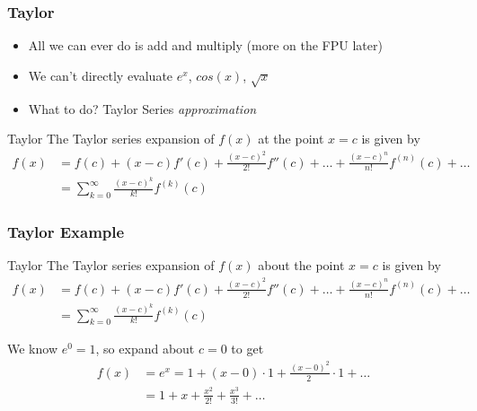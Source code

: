 \documentclass[10pt]{beamer}
\begin{document}
\begin{frame}
\frametitle{Taylor}
  \begin{itemize}
    \item All we can ever do is add and multiply (more on the FPU later)
    \item We can't directly evaluate $e^{x}$, $cos(x)$, $\sqrt{x}$
    \item What to do?  Taylor Series \emph{approximation}
\end{itemize}
\begin{block}{Taylor}
  The Taylor series expansion of $f(x)$ at the point $x=c$ is given by
  \begin{align*}
    f(x) &= f(c) + (x-c) f'(c) + \frac{(x-c)^2}{2!} f''(c) + \dots +
\frac{(x-c)^n}{n!} f^{(n)}(c)+\dots\\
        &= \sum_{k=0}^{\infty} \frac{(x-c)^{k}}{k!} f^{(k)}(c)
\end{align*}
\end{block}
\end{frame}
\begin{frame}
\frametitle{Taylor Example}
\begin{block}{Taylor}
  The Taylor series expansion of $f(x)$ about the point $x=c$ is given by
  \begin{align*}
    f(x) &= f(c) + (x-c) f'(c) + \frac{(x-c)^2}{2!} f''(c) + \dots +
\frac{(x-c)^n}{n!} f^{(n)}(c)+\dots\\
        &= \sum_{k=0}^{\infty} \frac{(x-c)^{k}}{k!} f^{(k)}(c)
\end{align*}
\end{block}
\begin{example}[$e^x$]
    We know $e^0 = 1$, so expand about $c=0$ to get
    \begin{align*}
    f(x) & = e^x = 1 + (x-0)\cdot 1 + \frac{(x-0)^2}{2~} \cdot 1 + \dots\\
          & = 1 + x + \frac{x^2}{2!} + \frac{x^3}{3!} + \dots
\end{align*}
\end{example}
\end{frame}
\end{document}
